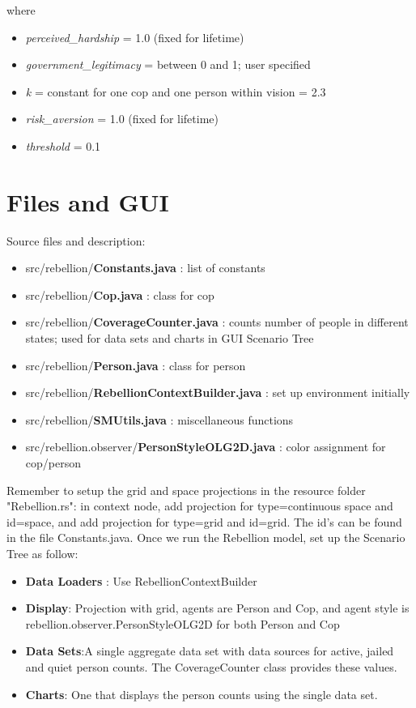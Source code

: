 \documentclass[11pt]{amsart}
\begin{document}
where 
\begin{itemize}
\item[] \emph{perceived\_hardship} = 1.0 (fixed for lifetime) 
\item[] \emph{government\_legitimacy} = between 0 and 1; user specified 
\item[] \emph{k} = constant for one cop and one person within vision = 2.3 
\item[] \emph{risk\_aversion} = 1.0 (fixed for lifetime) 
\item[] \emph{threshold} = 0.1 
\end{itemize}

\section{Files and GUI}

Source files and description:
\begin{itemize}
\item[] src/rebellion/\textbf{Constants.java} : list of constants
\item[] src/rebellion/\textbf{Cop.java} : class for cop
\item[] src/rebellion/\textbf{CoverageCounter.java} : counts number of people in different states; used for data sets and charts in GUI Scenario Tree
\item[] src/rebellion/\textbf{Person.java} : class for person
\item[] src/rebellion/\textbf{RebellionContextBuilder.java} : set up environment initially
\item[] src/rebellion/\textbf{SMUtils.java} : miscellaneous functions
\item[] src/rebellion.observer/\textbf{PersonStyleOLG2D.java} : color assignment for cop/person
\end{itemize}

Remember to setup the grid and space projections in the resource folder "Rebellion.rs": in context node, add projection for type=continuous space and id=space, and add projection for type=grid and id=grid.  The id's can be found in the file Constants.java.  Once we run the Rebellion model, set up the Scenario Tree as follow:\\
\begin{itemize}
\item \textbf{Data Loaders} : Use RebellionContextBuilder
\item\textbf{Display}: Projection with grid, agents are Person and Cop, and agent style is  rebellion.observer.PersonStyleOLG2D for both Person and Cop
\item \textbf{Data Sets}:A single aggregate data set with data sources for active, jailed and quiet person counts. The CoverageCounter class provides these values.
\item \textbf{Charts}: One that displays the person counts using the single data set.

\end{itemize}
\end{document}
